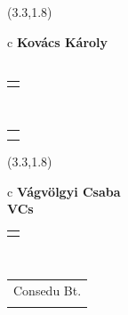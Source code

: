 \documentclass[11pt]{article}
\begin{document}
\makebox(3.3,1.8){
  \renewcommand\arraystretch{1.3}
  \begin{tabular}[c]{c}
    \hspace{8.5mm}
    \LARGE\bf{ Kovács Károly }\\
    \hspace{8.5mm}
    \Large{  }\\
    \renewcommand\arraystretch{3}
    \begin{tabular}[c]{c}
      \centering
      \fontfamily{phv}\selectfont{
        \textbf{
          \textsc{
            \scriptsize{
            \color{Bright}{ Ismerkedő }\color{Dark}{ Webmester }\color{Bright}{ Sminkmester }\color{Dark}{ Programozó }
            }
          }
        }
      }
    \end{tabular}
    \\
    \renewcommand\arraystretch{1}
    \begin{tabular}{p{3.3in}}
      \hspace{.7cm}\\
      \hspace{.7cm}\emph{  }\\
    \end{tabular}
  \end{tabular}
}

\makebox(3.3,1.8){
  \renewcommand\arraystretch{1.3}
  \begin{tabular}[c]{c}
    \hspace{8.5mm}
    \LARGE\bf{ Vágvölgyi Csaba }\\
    \hspace{8.5mm}
    \Large{ VCs }\\
    \renewcommand\arraystretch{3}
    \begin{tabular}[c]{c}
      \centering
      \fontfamily{phv}\selectfont{
        \textbf{
          \textsc{
            \scriptsize{
            \color{Dark}{ Ismerkedő }\color{Dark}{ Webmester }\color{Bright}{ Sminkmester }\color{Bright}{ Programozó }
            }
          }
        }
      }
    \end{tabular}
    \\
    \renewcommand\arraystretch{1}
    \begin{tabular}{p{3.3in}}
      \hspace{.7cm}Consedu Bt.\\
      \hspace{.7cm}\emph{  }\\
    \end{tabular}
  \end{tabular}
}
\end{document}
